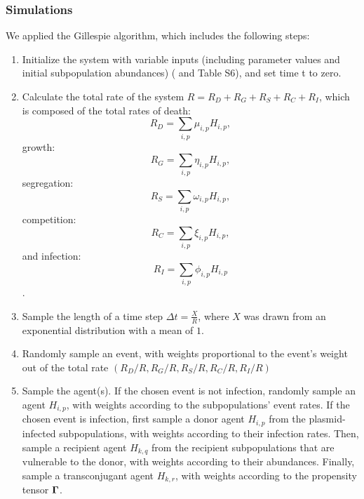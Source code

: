 \documentclass[10pt,letterpaper]{article}
\begin{document}
\subsubsection*{Simulations} We applied the Gillespie algorithm, which includes the following steps:
\begin{enumerate}
    \item Initialize the system with variable inputs (including parameter values and initial subpopulation abundances) ( and Table S6), and set time t to zero.
    
    \item Calculate the total rate of the system $R = R_D+R_G+R_S+R_C+R_I$, which is composed of the total rates of death:
    \begin{equation}
        R_D=\sum_{i,p}\mu_{i,p}H_{i,p}, \label{eq6}
    \end{equation} 
    growth: 
    \begin{equation}
        R_G=\sum_{i,p}\eta_{i,p}H_{i,p}, \label{eq7}
    \end{equation} 
    segregation:
    \begin{equation}
        R_S=\sum_{i,p}\omega_{i,p}H_{i,p}, \label{eq8}
    \end{equation}
    competition:
    \begin{equation}
        R_C=\sum_{i,p}\xi_{i,p}H_{i,p}, \label{eq9}
    \end{equation}
    and infection:
    \begin{equation}
        R_I=\sum_{i,p}\phi_{i,p}H_{i,p} \label{eq10}
    \end{equation}.
    
    \item Sample the length of a time step $\Delta t = \frac{X}{R}$, where $X$ was drawn from an exponential distribution with a mean of $1$.
    
    \item Randomly sample an event, with weights proportional to the event's weight out of the  total rate $(R_D/R, R_G/R, R_S/R, R_C/R, R_I/R)$
    
    \item Sample the agent(s). If the chosen event is not infection, randomly sample an agent $H_{i,p}$, with weights according to the subpopulations' event rates. If the chosen event is infection, first sample a donor agent $H_{i,p}$ from the plasmid-infected subpopulations, with weights according to their infection rates. Then, sample a recipient agent $H_{k,q}$ from the recipient subpopulations that are vulnerable to the donor, with weights according to their abundances. Finally, sample a transconjugant agent $H_{k,r}$, with weights according to the propensity tensor $\vb*{\Gamma}$.
    

\end{enumerate}
\end{document}
